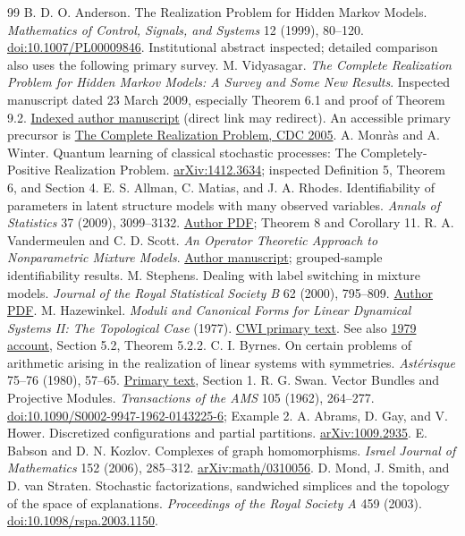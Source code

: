 \documentclass[11pt]{article}
\theoremstyle{definition}\newtheorem{definition}[theorem]{Definition}
\theoremstyle{remark}\newtheorem{remark}[theorem]{Remark}
\begin{document}
\begin{thebibliography}{99}
 B. D. O. Anderson. The Realization Problem for Hidden Markov Models. \emph{Mathematics of Control, Signals, and Systems} 12 (1999), 80--120. \href{https://doi.org/10.1007/PL00009846}{doi:10.1007/PL00009846}. Institutional abstract inspected; detailed comparison also uses the following primary survey.
 M. Vidyasagar. \emph{The Complete Realization Problem for Hidden Markov Models: A Survey and Some New Results}. Inspected manuscript dated 23 March 2009, especially Theorem 6.1 and proof of Theorem 9.2. \href{https://personal.utdallas.edu/~mxv091000/Research/hmm-full.pdf\#page=1}{Indexed author manuscript} (direct link may redirect). An accessible primary precursor is \href{https://skoge.folk.ntnu.no/prost/proceedings/cdc-ecc05/pdffiles/papers/0862.pdf}{The Complete Realization Problem, CDC 2005}.
 A. Monr\`as and A. Winter. Quantum learning of classical stochastic processes: The Completely-Positive Realization Problem. \href{https://arxiv.org/abs/1412.3634}{arXiv:1412.3634}; inspected Definition 5, Theorem 6, and Section 4.
 E. S. Allman, C. Matias, and J. A. Rhodes. Identifiability of parameters in latent structure models with many observed variables. \emph{Annals of Statistics} 37 (2009), 3099--3132. \href{https://jarhodesuaf.github.io/papers/Latent.pdf}{Author PDF}; Theorem 8 and Corollary 11.
 R. A. Vandermeulen and C. D. Scott. \emph{An Operator Theoretic Approach to Nonparametric Mixture Models}. \href{https://web.eecs.umich.edu/~cscott/pubs/aos_mixture.pdf}{Author manuscript}; grouped-sample identifiability results.
 M. Stephens. Dealing with label switching in mixture models. \emph{Journal of the Royal Statistical Society B} 62 (2000), 795--809. \href{https://stephenslab.uchicago.edu/assets/papers/Stephens2000b.pdf}{Author PDF}.
 M. Hazewinkel. \emph{Moduli and Canonical Forms for Linear Dynamical Systems II: The Topological Case} (1977). \href{https://ir.cwi.nl/pub/10022/10022D.pdf}{CWI primary text}. See also \href{https://ir.cwi.nl/pub/10385/10385D.pdf}{1979 account}, Section 5.2, Theorem 5.2.2.
 C. I. Byrnes. On certain problems of arithmetic arising in the realization of linear systems with symmetries. \emph{Ast\'erisque} 75--76 (1980), 57--65. \href{https://www.numdam.org/article/AST_1980__75-76__57_0.pdf}{Primary text}, Section 1.
 R. G. Swan. Vector Bundles and Projective Modules. \emph{Transactions of the AMS} 105 (1962), 264--277. \href{https://doi.org/10.1090/S0002-9947-1962-0143225-6}{doi:10.1090/S0002-9947-1962-0143225-6}; Example 2.
 A. Abrams, D. Gay, and V. Hower. Discretized configurations and partial partitions. \href{https://arxiv.org/abs/1009.2935}{arXiv:1009.2935}.
 E. Babson and D. N. Kozlov. Complexes of graph homomorphisms. \emph{Israel Journal of Mathematics} 152 (2006), 285--312. \href{https://arxiv.org/abs/math/0310056}{arXiv:math/0310056}.
 D. Mond, J. Smith, and D. van Straten. Stochastic factorizations, sandwiched simplices and the topology of the space of explanations. \emph{Proceedings of the Royal Society A} 459 (2003). \href{https://doi.org/10.1098/rspa.2003.1150}{doi:10.1098/rspa.2003.1150}.
\end{thebibliography}
\end{document}

